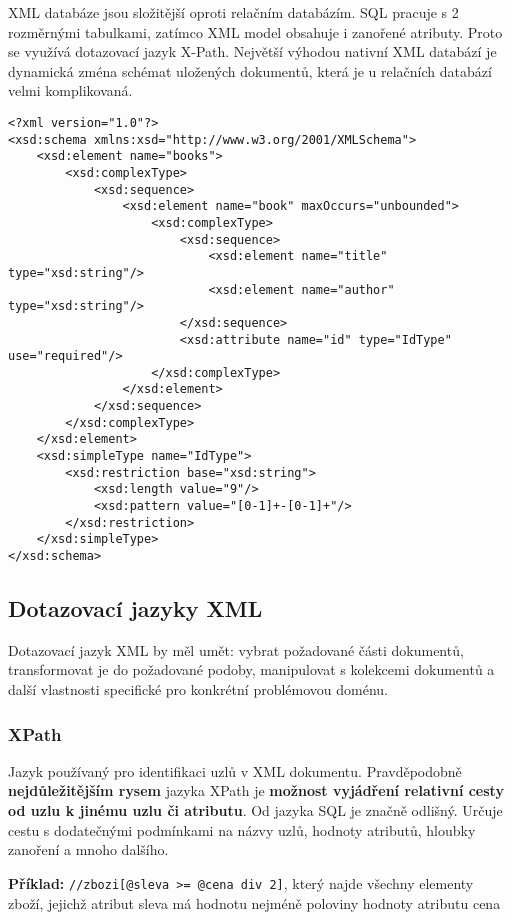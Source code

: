 XML databáze jsou složitější oproti relačním databázím. SQL pracuje s 2 rozměrnými tabulkami, zatímco XML model obsahuje i zanořené atributy. Proto se využívá dotazovací jazyk X-Path. Největší výhodou nativní XML databází je dynamická zména schémat uložených dokumentů, která je u relačních databází velmi komplikovaná.

\begin{verbatim}
<?xml version="1.0"?>
<xsd:schema xmlns:xsd="http://www.w3.org/2001/XMLSchema">
    <xsd:element name="books">
        <xsd:complexType>
            <xsd:sequence>
                <xsd:element name="book" maxOccurs="unbounded">
                    <xsd:complexType>
                        <xsd:sequence>
                            <xsd:element name="title" type="xsd:string"/>
                            <xsd:element name="author" type="xsd:string"/>
                        </xsd:sequence>
                        <xsd:attribute name="id" type="IdType" use="required"/>
                    </xsd:complexType>
                </xsd:element>
            </xsd:sequence>
        </xsd:complexType>
    </xsd:element>
    <xsd:simpleType name="IdType">
        <xsd:restriction base="xsd:string">
            <xsd:length value="9"/>
            <xsd:pattern value="[0-1]+-[0-1]+"/>
        </xsd:restriction>
    </xsd:simpleType>
</xsd:schema>
\end{verbatim}

\subsection{Dotazovací jazyky XML}
Dotazovací jazyk XML by měl umět: vybrat požadované části dokumentů, transformovat je do požadované podoby, manipulovat s kolekcemi dokumentů a další vlastnosti specifické pro konkrétní problémovou doménu.

\subsubsection{XPath}
Jazyk používaný pro identifikaci uzlů v XML dokumentu. Pravděpodobně \textbf{nejdůležitějším rysem} jazyka XPath je \textbf{možnost vyjádření relativní cesty od uzlu k jinému uzlu či atributu}. Od jazyka SQL je značně odlišný. Určuje cestu s dodatečnými podmínkami na názvy uzlů, hodnoty atributů, hloubky zanoření a mnoho dalšího.

\textbf{Příklad:} \texttt{//zbozi[@sleva >= @cena div 2]}, který najde všechny elementy zboží, jejichž atribut sleva má hodnotu nejméně poloviny hodnoty atributu cena

